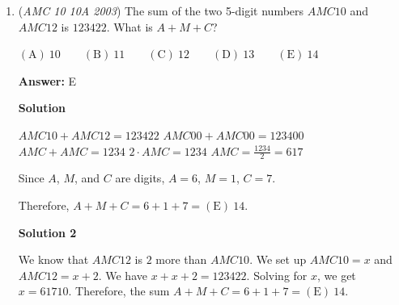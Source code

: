 \begin{enumerate}
 So, any "new" square that is attatched to those edges will prevent the polygon from becoming a cube with one face missing. 

 Therefore, squares $1$, $2$, and $3$ will prevent the polygon from becoming a cube with one face missing.

 Squares  $4$, $5$, $6$, $7$, $8$, and $9$ will allow the polygon to become a cube with one face missing when folded. 

 Thus the answer is $\boxed{\mathrm{(E)}\ 6}$.

 



\textbf{Solution 2}

Another way to think of it is that a cube missing one face has $5$ of its $6$ faces.  Since the shape has $4$ faces already, we need another face.  The only way to add another face is if the added square does not overlap any of the others.  $1$,$2$, and $3$ overlap, while squares $4$ to $9$ do not. The answer is $\boxed{\mathrm{(E)}\ 6}$




\textbf{Solution 3}

If you're good at visualizing, you can imagine each box and fold up the shape into a 3D shape. This solution is only recommended if you are either in a hurry or extremely skilled at visualizing. We find out that $4,5,6,7,8$ and $9$ work. Therefore, the answer is $\boxed{\mathrm{(E)}\ 6}$. ~Sophia866

 


	\item (\textit{AMC 10 10A 2003}) The sum of the two 5-digit numbers $AMC10$ and $AMC12$ is $123422$. What is $A+M+C$? 


 $\mathrm{(A) \ } 10\qquad \mathrm{(B) \ } 11\qquad \mathrm{(C) \ } 12\qquad \mathrm{(D) \ } 13\qquad \mathrm{(E) \ } 14$

 \textbf{Answer: }E



\textbf{Solution}

$AMC10+AMC12=123422$
$AMC00+AMC00=123400$
$AMC+AMC=1234$
$2\cdot AMC=1234$
$AMC=\frac{1234}{2}=617$

 Since $A$, $M$, and $C$ are digits, $A=6$, $M=1$, $C=7$. 

 Therefore, $A+M+C = 6+1+7 = \boxed{\mathrm{(E)}\ 14}$.

 



\textbf{Solution 2}

We know that $AMC12$ is $2$ more than $AMC10$. We set up $AMC10=x$ and $AMC12=x+2$. We have $x+x+2=123422$. Solving for $x$, we get $x=61710$. Therefore, the sum $A+M+C= 6+1+7 = \boxed{\mathrm{(E)}\ 14}$.


\end{enumerate}
